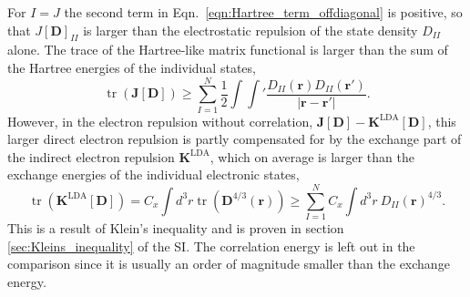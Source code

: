 \documentclass[journal=jpclcd,manuscript=letter]{achemso}
\DeclareMathOperator{\tr}{tr}
\newcommand\m[1]{\mathbf{#1}}
\renewcommand\vec[1]{\mathbf{#1}}
\begin{document}
For $I=J$ the second term in Eqn.~\ref{eqn:Hartree_term_offdiagonal} is positive, so that
$J[\m{D}]_{II}$ is larger than the electrostatic repulsion of the state density $D_{II}$ alone. The trace of the Hartree-like
matrix functional is larger than the sum of the Hartree energies of the individual states,
\begin{equation}
 \tr(\m{J}[\m{D}]) \ge \sum_{I=1}^{N} \frac{1}{2} \int \int' \frac{D_{II}(\vec{r}) D_{II}(\vec{r}')}{\vert \vec{r} - \vec{r}' \vert}. \label{eqn:J_inequality}
\end{equation}
However, in the electron repulsion without correlation, $\m{J}[\m{D}] - \m{K}^{\text{LDA}}[\m{D}]$,
this larger direct electron repulsion is partly compensated for by the
exchange part of the indirect electron repulsion $\m{K}^{\text{LDA}}$, which on average is larger than the
exchange energies of the individual electronic states,
\begin{equation}
 \tr(\m{K}^{\text{LDA}}[\m{D}]) = C_x \int d^3r \tr(\m{D}^{4/3}(\vec{r})) \ge \sum_{I=1}^N C_x \int d^3r ~ D_{II}(\vec{r})^{4/3}. \label{eqn:K_inequality}
\end{equation}
This is a result of Klein's inequality \cite{wiki:Kleins_inequality} \cite{Ruelle1969statistical} and is proven in section \ref{sec:Kleins_inequality} of the SI.
The correlation energy is left out in the comparison since it is usually an order of magnitude smaller than the exchange energy.
\end{document}
